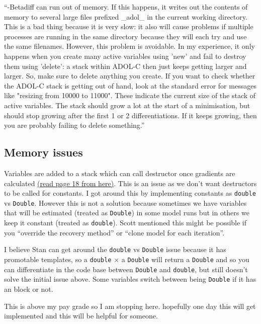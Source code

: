 \enquote{-Betadiff can run out of memory. If this happens, it writes out the contents of memory to several large files prefixed \_adol\_ in the current working directory. This is a bad thing because it is very slow: it also will cause problems if multiple processes are running in the same directory because they will each try and use the same filenames. However, this problem is avoidable. In my experience, it only happens when you create many active variables using 'new' and fail to destroy them using 'delete': a stack within ADOL-C then just keeps getting larger and larger. So, make sure to delete anything you create. If you want to check whether the ADOL-C stack is getting out of hand, look at the standard error for messages like "resizing from 10000 to 11000". These indicate the current size of the stack of active variables. The stack should grow a lot at the start of a minimisation, but should stop growing after the first 1 or 2 differentiations. If it keeps growing, then you are probably failing to delete something.}


\subsection{Memory issues}
Variables are added to a stack which can call destructor once gradients are calculated \href{https://arxiv.org/pdf/1509.07164.pdf}{(read page 18 from here)}. This is an issue as we don't want destructors to be called for constants. I got around this by implementing constants as \texttt{double} vs \texttt{Double}. However this is not a solution because sometimes we have variables that will be estimated (treated as \texttt{Double}) in some model runs but in others we keep it constant (treated as \texttt{double}). Scott mentioned this might be possible if you \enquote{override the recovery method} or \enquote{clone model for each iteration}.


I believe Stan can get around the \texttt{double} vs \texttt{Double} issue because it has promotable templates, so a \texttt{double} $\times$ a \texttt{Double} will return a \texttt{Double} and so you can differentiate in the code base between \texttt{Double} and \texttt{double}, but still doesn't solve the initial issue above. Some variables switch between being \texttt{Double} if it has an  block or not.

This is above my pay grade so I am stopping here. hopefully one day this will get implemented and this will be helpful for someone.

